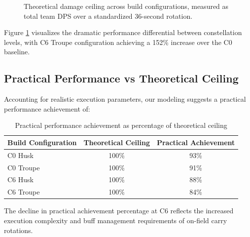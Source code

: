 \documentclass[12pt,a4paper]{article}
\begin{document}
\begin{figure}[H]
\centering
{}
\caption{Theoretical damage ceiling across build configurations, measured as total team DPS over a standardized 36-second rotation.}
\label{fig:damage_ceiling}
\end{figure}

Figure \ref{fig:damage_ceiling} visualizes the dramatic performance differential between constellation levels, with C6 Troupe configuration achieving a 152\% increase over the C0 baseline.

\subsection{Practical Performance vs Theoretical Ceiling}

Accounting for realistic execution parameters, our modeling suggests a practical performance achievement of:

\begin{table}[h]
\centering
\begin{tabular}{lcc}
\toprule
\textbf{Build Configuration} & \textbf{Theoretical Ceiling} & \textbf{Practical Achievement} \\
\midrule
C0 Husk & 100\% & 93\% \\
C0 Troupe & 100\% & 91\% \\
C6 Husk & 100\% & 88\% \\
C6 Troupe & 100\% & 84\% \\
\bottomrule
\end{tabular}
\caption{Practical performance achievement as percentage of theoretical ceiling}
\label{tab:practical_performance}
\end{table}

The decline in practical achievement percentage at C6 reflects the increased execution complexity and buff management requirements of on-field carry rotations.
\end{document}
